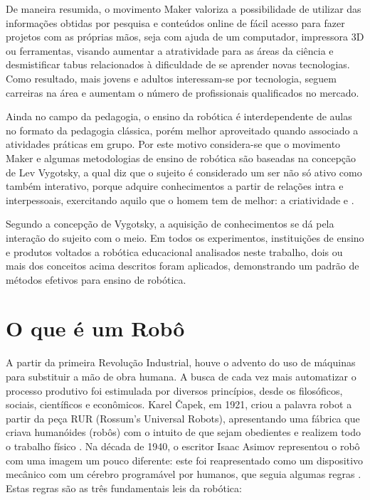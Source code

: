 De maneira resumida, o movimento Maker valoriza a possibilidade de utilizar das informações obtidas por pesquisa e conteúdos online de fácil acesso para fazer projetos com as próprias mãos, seja com ajuda de um computador, impressora 3D ou ferramentas, visando aumentar a atratividade para as áreas da ciência e desmistificar tabus relacionados à dificuldade de se aprender novas tecnologias. Como resultado, mais jovens e adultos interessam-se por tecnologia, seguem carreiras na área e aumentam o número de profissionais qualificados no mercado.

Ainda no campo da pedagogia, o ensino da robótica é interdependente de aulas no formato da pedagogia clássica, porém melhor aproveitado quando associado a atividades práticas em grupo. Por este motivo considera-se que o movimento Maker e algumas metodologias de ensino de robótica são baseadas na concepção de Lev Vygotsky, a qual diz que o sujeito é considerado um ser não só ativo como também interativo, porque adquire conhecimentos a partir de relações intra e interpessoais, exercitando aquilo que o homem tem de melhor: a criatividade \cite{palangana} e \cite{rocha}.

Segundo a concepção de Vygotsky, a aquisição de conhecimentos se dá pela interação do sujeito com o meio. Em todos os experimentos, instituições de ensino e produtos voltados a robótica educacional  analisados neste trabalho, dois ou mais dos conceitos acima descritos foram aplicados, demonstrando um padrão de métodos efetivos para ensino de robótica.



\section{O que é um Robô}\label{sec:oque_robo}
A partir da primeira Revolução Industrial, houve o advento do uso de máquinas para substituir a mão de obra humana. A busca de cada vez mais automatizar o processo produtivo foi estimulada por diversos princípios, desde os filosóficos, sociais, científicos e  econômicos. Karel Čapek, em 1921, criou a palavra robot a partir da peça RUR (Rossum's Universal Robots), apresentando uma fábrica que criava humanóides (robôs) com o intuito de que sejam obedientes e realizem todo o trabalho físico \cite{wellek}. Na década de 1940, o escritor Isaac Asimov representou o robô com uma imagem um pouco diferente: este foi reapresentado como um dispositivo mecânico com um cérebro programável por humanos, que seguia algumas regras \cite{asimov}. Estas regras são as três fundamentais leis da robótica:

